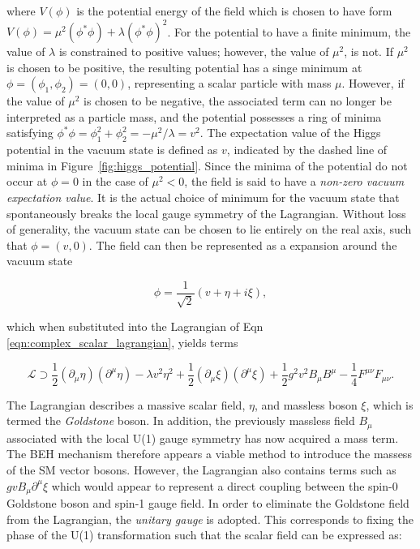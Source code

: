 \noindent where $V(\phi)$ is the potential energy of the field which is chosen to have form $V(\phi) =  \mu^{2}(\phi^{*}\phi) + \lambda(\phi^{*}\phi)^{2}$. For the potential to have a finite minimum, the value of $\lambda$ is constrained to positive values; however, the value of $\mu^{2}$, is not. If $\mu^{2}$ is chosen to be positive, the resulting potential has a singe minimum at $\phi=(\phi_{1},\phi_{2})=(0,0)$, representing a scalar particle with mass $\mu$. However, if the value of $\mu^{2}$ is chosen to be negative, the associated term can no longer be interpreted as a particle mass, and the potential possesses a ring of minima satisfying $\phi^{*}\phi = \phi_{1}^{2} + \phi_{2}^{2} = -\mu^{2}/\lambda = v^{2}$. The expectation value of the Higgs potential in the vacuum state is defined as $v$, indicated by the dashed line of minima in Figure~\ref{fig:higgs_potential}. Since the minima of the potential do not occur at $\phi=0$ in the case of $\mu^{2}<0$, the field is said to have a \textit{non-zero vacuum expectation value}. It is the actual choice of minimum for the vacuum state that spontaneously breaks the local gauge symmetry of the Lagrangian. Without loss of generality, the vacuum state can be chosen to lie entirely on the real axis, such that $\phi=(v,0)$. The field can then be represented as a expansion around the vacuum state

\begin{equation}
    \phi = \frac{1}{\sqrt{2}}(v + \eta + i\xi),
\end{equation}

\noindent which when substituted into the Lagrangian of Eqn \ref{eqn:complex_scalar_lagrangian}, yields terms~\cite{Thomson}

\begin{equation}
    \mathcal{L} \supset \frac{1}{2}(\partial_{\mu}\eta)(\partial^{\mu}\eta) - \lambda v^{2}\eta^{2} + \frac{1}{2}(\partial_{\mu}\xi)(\partial^{\mu}\xi) + \frac{1}{2}g^{2}v^{2}B_{\mu}B^{\mu} - \frac{1}{4}F^{\mu\nu}F_{\mu\nu}.
\end{equation}

\noindent The Lagrangian describes a massive scalar field, $\eta$, and massless boson $\xi$, which is termed the \textit{Goldstone} boson. In addition, the previously massless field $B_{\mu}$ associated with the local U(1) gauge symmetry has now acquired a mass term. The BEH mechanism therefore appears a viable method to introduce the massess of the SM vector bosons. However, the Lagrangian also contains terms such as $gvB_{\mu}\partial^{\mu}\xi$ which would appear to represent a direct coupling between the spin-0 Goldstone boson and spin-1 gauge field. In order to eliminate the Goldstone field from the Lagrangian, the \textit{unitary gauge} is adopted. This corresponds to fixing the phase of the U(1) transformation such that the scalar field can be expressed as:

